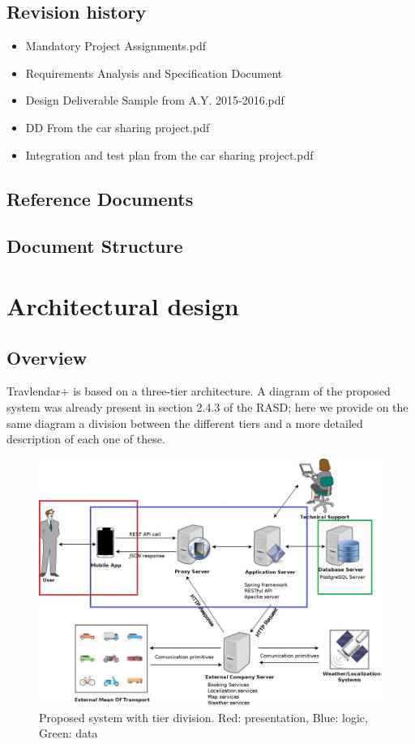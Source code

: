 \documentclass[a4paper,leqno]{article}
\begin{document}
\subsection{Revision history}
\begin{itemize}
	\item Mandatory Project Assignments.pdf
	\item Requirements Analysis and Specification Document
	\item Design Deliverable Sample from A.Y. 2015-2016.pdf
	\item DD From the car sharing project.pdf
	\item Integration and test plan from the car sharing project.pdf
\end{itemize}

\subsection{Reference Documents}
\subsection{Document Structure}

\newpage
\section{Architectural design}

\subsection{Overview}
Travlendar+ is based on a three-tier architecture. A diagram of the proposed system was already present in section 2.4.3 of the RASD; here we provide on the same diagram a division between the different tiers and a more detailed description of each one of these.

\begin{figure}[!h]
	\begin{centering}
		\includegraphics[scale=0.3]{ProposedSystemDiagram_17112017_1}
	\end{centering}
	\caption{Proposed system with tier division. Red: presentation, Blue: logic, Green: data}
\end{figure}
\end{document}
